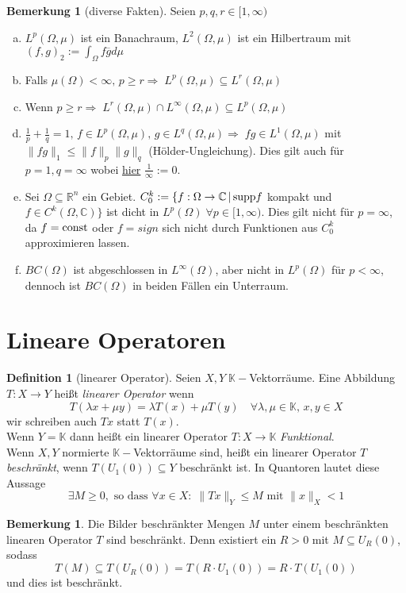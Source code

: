 \documentclass[ngerman]{report}
\theoremstyle{plain}%
\theoremstyle{definition}%
\newtheorem{definition}[thm]{Definition}
\theoremstyle{myStyle}
\newtheorem{bem}[thm]{Bemerkung}
\newtheorem*{bem*}{Bemerkung}
\newcommand{\C}{\mathbb{C}}
\newcommand{\R}{\mathbb{R}}
\newcommand{\K}{\mathbb{K}}
\newcommand{\supp}{\textnormal{supp}}
\newcommand{\norm}[1]{\|#1\|}
\begin{document}
\begin{bem}[diverse Fakten]
	Seien $p,q,r\in [1,\infty)$
	\begin{enumerate}[(a)]
		\item $L^p(\Omega,\mu)$ ist ein Banachraum, $L^2(\Omega,\mu)$ ist ein Hilbertraum mit $(f,g)_2 := \int_\Omega f \overline{g} d\mu$
		
		\item Falls $\mu(\Omega) < \infty,\, p\geq r \Rightarrow\; L^p(\Omega,\mu)\subseteq L^r(\Omega,\mu)$
		
		\item Wenn $p\geq r\Rightarrow\; L^r(\Omega,\mu)\cap L^\infty(\Omega,\mu)\subseteq L^p(\Omega,\mu)$
		
		\item $\frac{1}{p}+\frac{1}{q}=1,\,f\in L^p(\Omega,\mu),\,g\in L^q(\Omega,\mu)\Rightarrow\;fg\in 		 L^1(\Omega,\mu)$ mit $\norm{fg}_1\leq\norm{f}_p\norm{g}_q$ (Hölder-Ungleichung). Dies gilt auch für $p=1, q=\infty$ wobei \underline{hier} $\frac{1}{\infty}:=0$.
		
		\item Sei $\Omega\subseteq \R^n$ ein Gebiet. $C^k_0:=\{f:\Omega \rightarrow \C\,|\, \supp f$ kompakt und $f\in C^k(\Omega,\C)\}$ ist dicht in $L^p(\Omega)\;\forall p\in[1,\infty)$. Dies gilt nicht für $p=\infty$, da $f=\textnormal{const}$ oder $f=sign$ sich nicht durch Funktionen aus $C^k_0$ approximieren lassen.
		
		\item $BC(\Omega)$ ist abgeschlossen in $L^\infty (\Omega)$, aber nicht in $L^p(\Omega)$ für $p<\infty$, dennoch ist $BC(\Omega)$ in beiden Fällen ein Unterraum.
	\end{enumerate}
\end{bem}



\section{Lineare Operatoren}

	\begin{definition}[linearer Operator]
		Seien $X,Y\; \K-$Vektorräume. Eine Abbildung $T:X\rightarrow Y$ heißt \textit{linearer Operator} wenn 
		$$T(\lambda x+\mu y) = \lambda T(x) + \mu T(y)\quad \forall \lambda,\mu \in \K,\,x,y\in X$$ 
		wir schreiben auch $Tx$ statt $T(x)$.\\
		Wenn $Y=\K$ dann heißt ein linearer Operator $T:X\rightarrow \K$\textit{ Funktional}.\\
		Wenn $X,Y$ normierte $\K-$Vektorräume sind, heißt ein linearer Operator $T$ \textit{beschränkt}, wenn $T(U_1(0)) \subseteq Y$ beschränkt ist. In Quantoren lautet diese Aussage
			$$ \exists M \geq 0, \text{ so dass } \forall x\in X :\; \norm{Tx}_Y \leq M \text{ mit } \norm{x}_X < 1$$
	\end{definition}
	\begin{bem*} 
	Die Bilder beschränkter Mengen $M$ unter einem beschränkten linearen Operator $T$ sind beschränkt. Denn existiert ein $R>0$ mit $M \subseteq  U_R(0)$, sodass 
		$$T(M) \subseteq T(U_R(0))=T(R\cdot U_1(0))=R\cdot T(U_1(0))$$
		und dies ist beschränkt.
	\end{bem*}
\end{document}
